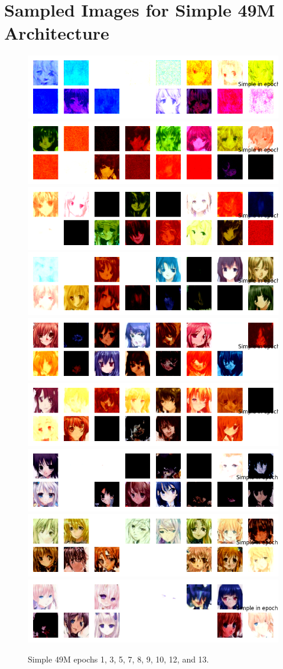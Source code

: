\documentclass[twocolumn,superscriptaddress,aps]{revtex4-1}
\begin{document}
\section{Sampled Images for Simple 49M Architecture}
\begin{figure}[H]
    \centering
    \includegraphics[width=.32\textwidth]{figures/simple_unet_ddpm_49M_ckpt_epoch_1_2025-08-13_04-50-49_epoch_1_samples.png}
    \includegraphics[width=.32\textwidth]{figures/simple_unet_ddpm_49M_ckpt_epoch_3_2025-08-13_10-10-46_epoch_3_samples.png}
    \includegraphics[width=.32\textwidth]{figures/simple_unet_ddpm_49M_ckpt_epoch_5_2025-08-13_15-33-49_epoch_5_samples.png}
    \includegraphics[width=.32\textwidth]{figures/simple_unet_ddpm_49M_ckpt_epoch_7_2025-08-13_20-54-54_epoch_7_samples.png}
    \includegraphics[width=.32\textwidth]{figures/simple_unet_ddpm_49M_ckpt_epoch_8_2025-08-13_23-35-23_epoch_8_samples.png}
    \includegraphics[width=.32\textwidth]{figures/simple_unet_ddpm_49M_ckpt_epoch_9_2025-08-14_02-15-01_epoch_9_samples.png}
    \includegraphics[width=.32\textwidth]{figures/simple_unet_ddpm_49M_ckpt_epoch_10_2025-08-14_04-54-39_epoch_10_samples.png}
    \includegraphics[width=.32\textwidth]{figures/simple_unet_ddpm_49M_ckpt_epoch_12_2025-08-14_10-13-47_epoch_12_samples.png}
    \includegraphics[width=.32\textwidth]{figures/simple_unet_ddpm_49M_ckpt_epoch_13_2025-08-14_12-52-58_epoch_13_samples.png}
    \caption{Simple 49M epochs 1, 3, 5, 7, 8, 9, 10, 12, and 13.}
    \label{fig:simple_49m_samples}
\end{figure}
\end{document}
